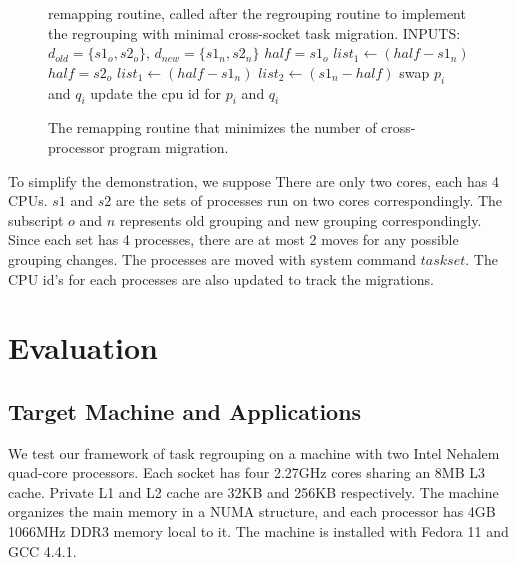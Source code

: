 \medskip
\begin{figure}[h!]
 \centering
 \small
 \begin{minipage}{\linewidth}
   \begin{algorithmic}[1]
     \REQUIRE remapping routine, called after the regrouping routine
     to implement the regrouping with minimal cross-socket task migration.
     \STATE INPUTS: $d_{old}=\{s1_{o}, s2_{o}\}$, $d_{new}=\{s1_{n}, s2_{n}\}$
     \STATE $half = s1_{o}$
     \STATE $list_1 \gets (half - s1_{n})$
        \STATE $half = s2_{o}$
        \STATE $list_1 \gets (half - s1_{n})$
     \ENDIF
     \STATE $list_2 \gets (s1_{n} - half)$
        \STATE swap $p_i$ and $q_i$
        \STATE update the cpu id for $p_i$ and $q_i$
     \ENDFOR
   \end{algorithmic}
   \caption{The remapping routine that minimizes the number of
     cross-processor program migration.}
   \label{alg:remapping}
 \end{minipage}
\end{figure}

To simplify the demonstration, we suppose There are
only two cores, each has 4 CPUs. $s1$ and $s2$ are the sets of
processes run on two cores correspondingly. The subscript $o$ and $n$
represents old grouping and new grouping correspondingly. Since each
set has 4 processes, there are at most 2 moves for any possible
grouping changes. The processes are moved with system command
$taskset$. The CPU id's for each processes are also updated to track
the migrations. 


\section{Evaluation}

\subsection{Target Machine and Applications}
\label{sec:eval_setup}

We test our framework of task regrouping on a machine with two Intel
Nehalem quad-core processors. Each socket has four 2.27GHz cores
sharing an 8MB L3 cache. Private L1 and L2 cache are 32KB and 256KB
respectively. The machine organizes the main memory in a NUMA
structure, and each processor has 4GB 1066MHz DDR3 memory local to
it. The machine is installed with Fedora 11 and GCC 4.4.1. 

